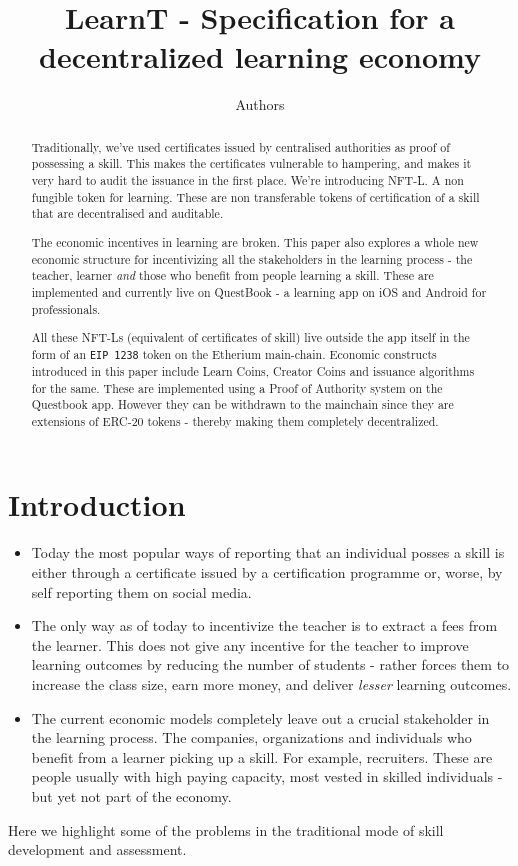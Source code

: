 \documentclass{article}
\author{Authors}
\title{LearnT - Specification for a decentralized learning economy}
\begin{document}
  \maketitle
  \begin{abstract}
    Traditionally, we've used certificates issued by centralised authorities as proof of possessing a skill.
    This makes the certificates vulnerable to hampering, and makes it very hard to audit the issuance in the first place.
    We're introducing NFT-L. A non fungible token for learning. These are non transferable tokens of certification of a skill that are decentralised and auditable.
    \par
    The economic incentives in learning are broken. This paper also explores a whole new economic structure for incentivizing all the stakeholders in the learning process - the teacher, learner \textit{and} those who benefit from people learning a skill. 
    These are implemented and currently live on QuestBook - a learning app on iOS and Android for professionals. 
    \par
    All these NFT-Ls (equivalent of certificates of skill) live outside the app itself in the form of an \texttt{EIP 1238} token on the Etherium main-chain.
    Economic constructs introduced in this paper include Learn Coins, Creator Coins and issuance algorithms for the same. These are implemented using a Proof of Authority system on the Questbook app. However they can be withdrawn to the mainchain since they are extensions of ERC-20 tokens - thereby making them completely decentralized.
  \end{abstract}
  \section{Introduction}
    \begin{itemize}
      \item Today the most popular ways of reporting that an individual posses a skill is either through a certificate issued by a certification programme or, worse, by self reporting them on social media.
      \item The only way as of today to incentivize the teacher is to extract a fees from the learner. This does not give any incentive for the teacher to improve learning outcomes by reducing the number of students - rather forces them to increase the class size, earn more money, and deliver \textit{lesser} learning outcomes.
      \item The current economic models completely leave out a crucial stakeholder in the learning process. The companies, organizations and individuals who benefit from a learner picking up a skill. For example, recruiters. These are people usually with high paying capacity, most vested in skilled individuals - but yet not part of the economy.
    \end{itemize}
    Here we highlight some of the problems in the traditional mode of skill development and assessment. 
\end{document}
